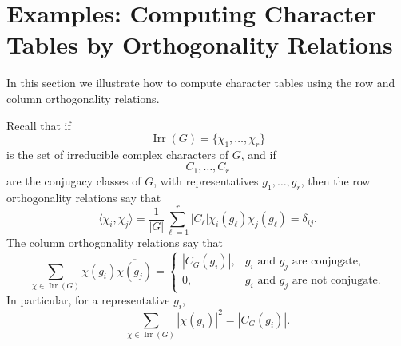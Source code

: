 \section{Examples: Computing Character Tables by Orthogonality Relations}

In this section we illustrate how to compute character tables using the row
and column orthogonality relations.

Recall that if
\[
    \operatorname{Irr}(G)=\{\chi_1,\dots,\chi_r\}
\]
is the set of irreducible complex characters of \(G\), and if
\[
    C_1,\dots,C_r
\]
are the conjugacy classes of \(G\), with representatives \(g_1,\dots,g_r\),
then the row orthogonality relations say that
\[
    \langle \chi_i,\chi_j\rangle
    =
    \frac{1}{|G|}
    \sum_{\ell=1}^r
    |C_\ell|\chi_i(g_\ell)\overline{\chi_j(g_\ell)}
    =
    \delta_{ij}.
\]
The column orthogonality relations say that
\[
    \sum_{\chi\in \operatorname{Irr}(G)}
    \chi(g_i)\overline{\chi(g_j)}
    =
    \begin{cases}
        |C_G(g_i)|, & g_i\text{ and }g_j\text{ are conjugate},\\
        0, & g_i\text{ and }g_j\text{ are not conjugate}.
    \end{cases}
\]
In particular, for a representative \(g_i\),
\[
    \sum_{\chi\in \operatorname{Irr}(G)}
    |\chi(g_i)|^2
    =
    |C_G(g_i)|.
\]

